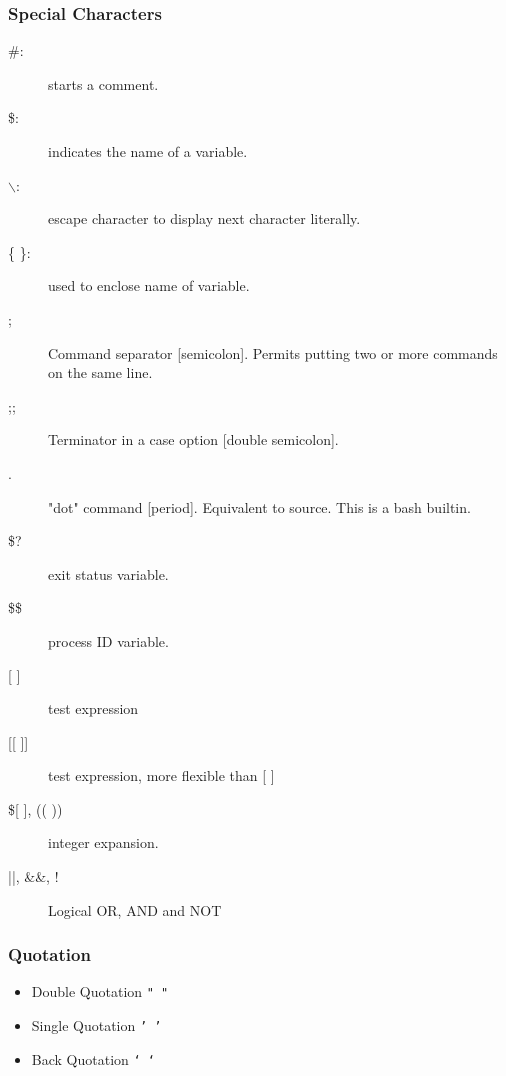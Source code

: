 \documentclass[c,compress,xcolor=svgnames]{beamer}
\newcommand{\Verbgreen}[1]{\Verb[formatcom=\color{dkgreen},fontseries=b,commandchars=\\\{\}]|#1|}
\newcommand{\Verbblue}[2][b]{\Verb[formatcom=\color{blue},fontshape=#1,commandchars=\\\{\}]|#2|}
\begin{document}
\begin{frame}
  \frametitle{\small Special Characters}
%  \fontsize{7}{9}\selectfont{
  \begin{description}
    \item[\#:] starts a comment.
    \item[\$:] indicates the name of a variable.
    \item[$\backslash$:] escape character to display next character literally.
    \item[\{ \}:] used to enclose name of variable.
    \item[;] Command separator [semicolon]. Permits putting two or more commands on the same line.
    \item[;;] Terminator in a case option [double semicolon].
    \item[.] "dot" command [period]. Equivalent to source. This is a bash builtin.
    \item[\$?] exit status variable.
    \item[\$\$] process ID variable.
    \item[{[ ]}] test expression
    \item[{[[ ]]}] test expression, more flexible than [ ]
    \item[{\$[ ], (( ))}] integer expansion.
    \item[||, \&\&, !] Logical OR, AND and NOT
  \end{description}
\end{frame}

\begin{frame}[fragile]
  \frametitle{\small Quotation}
  \begin{itemize}
    \item Double Quotation \texttt{" "}
    \item Single Quotation \texttt{' '}
    \item Back Quotation \texttt{` `}
  \end{itemize}
\end{frame}
\end{document}
